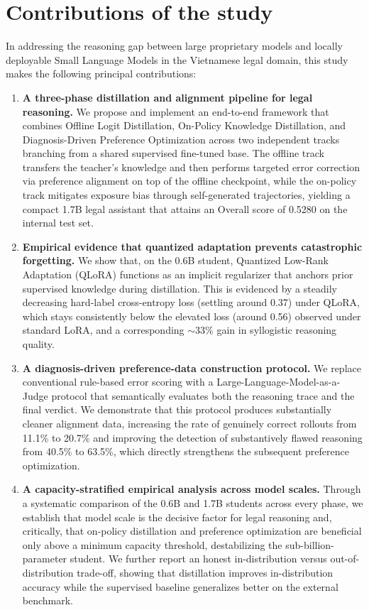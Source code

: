 \section{Contributions of the study}

In addressing the reasoning gap between large proprietary models and locally deployable Small Language Models in the Vietnamese legal domain, this study makes the following principal contributions:

\begin{enumerate}
    \item \textbf{A three-phase distillation and alignment pipeline for legal reasoning.} We propose and implement an end-to-end framework that combines Offline Logit Distillation, On-Policy Knowledge Distillation, and Diagnosis-Driven Preference Optimization across two independent tracks branching from a shared supervised fine-tuned base. The offline track transfers the teacher's knowledge and then performs targeted error correction via preference alignment on top of the offline checkpoint, while the on-policy track mitigates exposure bias through self-generated trajectories, yielding a compact 1.7B legal assistant that attains an Overall score of 0.5280 on the internal test set.

    \item \textbf{Empirical evidence that quantized adaptation prevents catastrophic forgetting.} We show that, on the 0.6B student, Quantized Low-Rank Adaptation (QLoRA) functions as an implicit regularizer that anchors prior supervised knowledge during distillation. This is evidenced by a steadily decreasing hard-label cross-entropy loss (settling around 0.37) under QLoRA, which stays consistently below the elevated loss (around 0.56) observed under standard LoRA, and a corresponding $\sim$33\% gain in syllogistic reasoning quality.

    \item \textbf{A diagnosis-driven preference-data construction protocol.} We replace conventional rule-based error scoring with a Large-Language-Model-as-a-Judge protocol that semantically evaluates both the reasoning trace and the final verdict. We demonstrate that this protocol produces substantially cleaner alignment data, increasing the rate of genuinely correct rollouts from 11.1\% to 20.7\% and improving the detection of substantively flawed reasoning from 40.5\% to 63.5\%, which directly strengthens the subsequent preference optimization.

    \item \textbf{A capacity-stratified empirical analysis across model scales.} Through a systematic comparison of the 0.6B and 1.7B students across every phase, we establish that model scale is the decisive factor for legal reasoning and, critically, that on-policy distillation and preference optimization are beneficial only above a minimum capacity threshold, destabilizing the sub-billion-parameter student. We further report an honest in-distribution versus out-of-distribution trade-off, showing that distillation improves in-distribution accuracy while the supervised baseline generalizes better on the external benchmark.


\end{enumerate}
